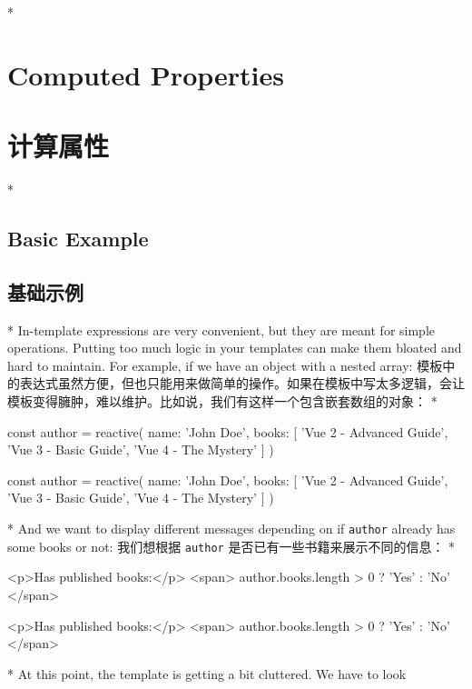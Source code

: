 
\begin{paracol}{2}

\switchcolumn[0]*%
\section{Computed Properties}
\switchcolumn
\section{计算属性}
\switchcolumn[0]*%
\subsection{Basic Example}
\switchcolumn
\subsection{基础示例}
\switchcolumn[0]*%
In-template expressions are very convenient, but they are meant for
simple operations. Putting too much logic in your templates can make
them bloated and hard to maintain. For example, if we have an object
with a nested array:
\switchcolumn
模板中的表达式虽然方便，但也只能用来做简单的操作。如果在模板中写太多逻辑，会让模板变得臃肿，难以维护。比如说，我们有这样一个包含嵌套数组的对象：
\switchcolumn[0]*%
\begin{codeJs}
const author = reactive({
    name: 'John Doe',
    books: [
        'Vue 2 - Advanced Guide',
        'Vue 3 - Basic Guide',
        'Vue 4 - The Mystery'
    ]
})
\end{codeJs}
\switchcolumn
\begin{codeJs}
const author = reactive({
    name: 'John Doe',
    books: [
        'Vue 2 - Advanced Guide',
        'Vue 3 - Basic Guide',
        'Vue 4 - The Mystery'
    ]
})
\end{codeJs}
\switchcolumn[0]*%
And we want to display different messages depending on if
\texttt{author} already has some books or not:
\switchcolumn
我们想根据 \texttt{author} 是否已有一些书籍来展示不同的信息：
\switchcolumn[0]*%
\begin{codeHtml}
<p>Has published books:</p>
<span>{{ author.books.length > 0 ? 'Yes' : 'No' }}</span>
\end{codeHtml}
\switchcolumn
\begin{codeHtml}
<p>Has published books:</p>
<span>{{ author.books.length > 0 ? 'Yes' : 'No' }}</span>
\end{codeHtml}
\switchcolumn[0]*%
At this point, the template is getting a bit cluttered. We have to look

\end{paracol}
